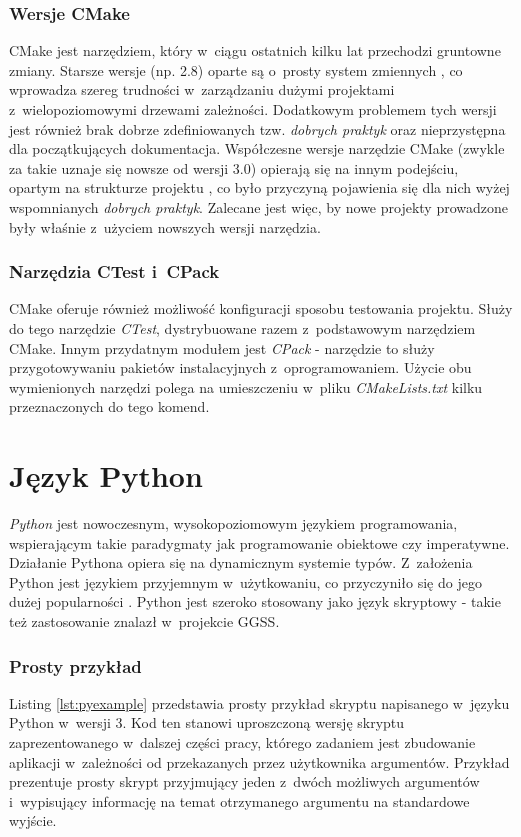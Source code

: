 \subsubsection*{Wersje CMake}
CMake jest narzędziem, który w~ciągu ostatnich kilku lat przechodzi gruntowne zmiany. Starsze wersje (np. 2.8) oparte są o~prosty system zmiennych \cite{CMakeRight}, co wprowadza szereg trudności w~zarządzaniu dużymi projektami z~wielopoziomowymi drzewami zależności. Dodatkowym problemem tych wersji jest również brak dobrze zdefiniowanych tzw. \textit{dobrych praktyk} oraz nieprzystępna dla początkujących dokumentacja. Współczesne wersje narzędzie CMake (zwykle za takie uznaje się nowsze od wersji 3.0) opierają się na innym  podejściu, opartym na strukturze projektu \cite{CMakeRight}, co było przyczyną pojawienia się dla nich wyżej wspomnianych \textit{dobrych praktyk}. Zalecane jest więc, by nowe projekty prowadzone były właśnie z~użyciem nowszych wersji narzędzia.

\subsubsection*{Narzędzia CTest i~CPack}
CMake oferuje również możliwość konfiguracji sposobu testowania projektu. Służy do tego narzędzie \textit{CTest}, dystrybuowane razem z~podstawowym narzędziem CMake. Innym przydatnym modułem jest \textit{CPack} - narzędzie to służy przygotowywaniu pakietów instalacyjnych z~oprogramowaniem. Użycie obu wymienionych narzędzi polega na umieszczeniu w~pliku \textit{CMakeLists.txt} kilku przeznaczonych do tego komend. \par 


\section{Język Python}
\textit{Python} jest nowoczesnym, wysokopoziomowym językiem programowania, wspierającym takie paradygmaty jak programowanie obiektowe czy imperatywne. Działanie Pythona opiera się na dynamicznym systemie typów. Z~założenia Python jest językiem przyjemnym w~użytkowaniu, co przyczyniło się do jego dużej popularności \cite{Lutz}. Python jest szeroko stosowany jako język skryptowy - takie też zastosowanie znalazł w~projekcie GGSS.

\subsubsection*{Prosty przykład}
Listing \ref{lst:pyexample} przedstawia prosty przykład skryptu napisanego w~języku Python w~wersji 3. Kod ten stanowi uproszczoną wersję skryptu zaprezentowanego w~dalszej części pracy, którego zadaniem jest zbudowanie aplikacji w~zależności od przekazanych przez użytkownika argumentów. Przykład prezentuje prosty skrypt przyjmujący jeden z~dwóch możliwych argumentów i~wypisujący informację na temat otrzymanego argumentu na standardowe wyjście.

